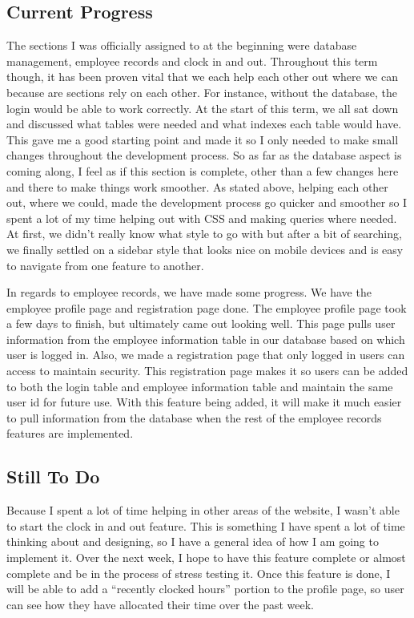 \documentclass[letterpaper,10pt,titlepage,journal,compsoc,draftclsnofoot,onecolumn]{IEEEtran}
\newcommand\tab[1][1cm]{\hspace*{#1}}
\begin{document}
\subsection{Current Progress}

\tab
The sections I was officially assigned to at the beginning were database management, employee records and clock in and out. Throughout this term though, it has been proven vital that we each help each other out where we can because are sections rely on each other. For instance, without the database, the login would be able to work correctly. At the start of this term, we all sat down and discussed what tables were needed and what indexes each table would have. This gave me a good starting point and made it so I only needed to make small changes throughout the development process. So as far as the database aspect is coming along, I feel as if this section is complete, other than a few changes here and there to make things work smoother. As stated above, helping each other out, where we could, made the development process go quicker and smoother so I spent a lot of my time helping out with CSS and making queries where needed. At first, we didn’t really know what style to go with but after a bit of searching, we finally settled on a sidebar style that looks nice on mobile devices and is easy to navigate from one feature to another.
\newline

\tab
In regards to employee records, we have made some progress. We have the employee profile page and registration page done. The employee profile page took a few days to finish, but ultimately came out looking well. This page pulls user information from the employee information table in our database based on which user is logged in. Also, we made a registration page that only logged in users can access to maintain security. This registration page makes it so users can be added to both the login table and employee information table and maintain the same user id for future use. With this feature being added, it will make it much easier to pull information from the database when the rest of the employee records features are implemented.
\newline

\subsection{Still To Do}

\tab
Because I spent a lot of time helping in other areas of the website, I wasn’t able to start the clock in and out feature. This is something I have spent a lot of time thinking about and designing, so I have a general idea of how I am going to implement it. Over the next week, I hope to have this feature complete or almost complete and be in the process of stress testing it. Once this feature is done, I will be able to add a “recently clocked hours” portion to the profile page, so user can see how they have allocated their time over the past week.
\newline
\end{document}
